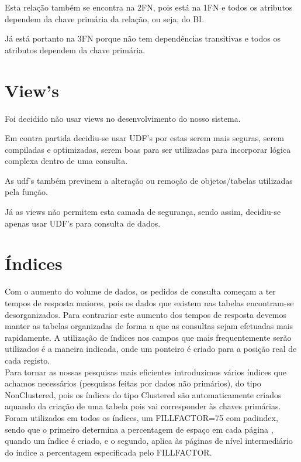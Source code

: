 \documentclass[pdftex,12pt,a4paper]{report}
\begin{document}
Esta relação também se encontra na 2FN, pois está na 1FN e todos os atributos dependem da chave primária da relação, ou seja, do BI.

Já está portanto na 3FN porque não tem dependências transitivas e todos os atributos dependem da chave primária.

\section{View's}
Foi decidido não usar views no desenvolvimento do nosso sistema. 

Em contra partida decidiu-se usar UDF's por estas serem mais seguras, serem compiladas e optimizadas, serem boas para ser utilizadas para incorporar lógica complexa dentro de uma consulta. 

As udf's também previnem a alteração ou remoção de objetos/tabelas utilizadas pela função.

Já as views não permitem esta camada de segurança, sendo assim, decidiu-se apenas usar UDF's para consulta de dados.

\newpage
\section{Índices}
Com o aumento do volume de dados, os pedidos de consulta começam a ter tempos de resposta maiores, pois os dados que existem nas tabelas encontram-se desorganizados. Para contrariar este aumento dos tempos de resposta devemos manter as tabelas organizadas de forma a que as consultas sejam efetuadas mais rapidamente. A utilização de índices nos campos que mais frequentemente serão utilizados é a maneira indicada, onde um ponteiro é criado para a posição real de cada registo.
\\

Para tornar as nossas pesquisas mais eficientes introduzimos vários índices que achamos necessários (pesquisas feitas por dados não primários), do tipo NonClustered, pois os índices do tipo Clustered são automaticamente criados aquando da criação de uma tabela pois vai corresponder às chaves primárias.
\\

Foram utilizados em todos os índices, um FILLFACTOR=75 com pad{\textunderscore}index, sendo que o primeiro determina a percentagem de espaço em cada página , quando um índice é criado, e o segundo, aplica às páginas de nível intermediário do índice a percentagem especificada pelo FILLFACTOR.
\\
\end{document}
